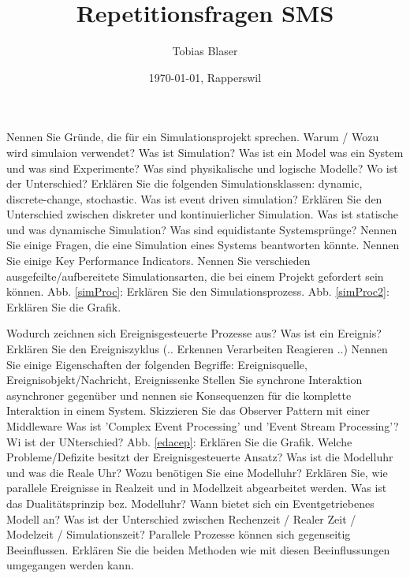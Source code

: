 \documentclass[ngerman,a4paper,12pt]{scrreprt}
\title{Repetitionsfragen SMS}
\author{Tobias Blaser}
\date{\today{}, Rapperswil}
\begin{document}
\tableofcontents
\clearpage

\ol
	\li Nennen Sie Gründe, die für ein Simulationsprojekt sprechen.
	\li Warum / Wozu wird simulaion verwendet?
	\li Was ist Simulation?
	\li Was ist ein Model was ein System und was sind Experimente?
	\li Was sind physikalische und logische Modelle? Wo ist der Unterschied?
	\li Erklären Sie die folgenden Simulationsklassen: dynamic, discrete-change, stochastic.
	\li Was ist event driven simulation?
	\li Erklären Sie den Unterschied zwischen diskreter und kontinuierlicher Simulation.
	\li Was ist statische und was dynamische Simulation?
	\li Was sind equidistante Systemsprünge?
	\li Nennen Sie einige Fragen, die eine Simulation eines Systems beantworten könnte.
	\li Nennen Sie einige Key Performance Indicators.
	\li Nennen Sie verschieden ausgefeilte/aufbereitete Simulationsarten, die bei einem Projekt gefordert sein können.
	\li Abb. \ref{simProc}: Erklären Sie den Simulationsprozess.
	\li Abb. \ref{simProc2}: Erklären Sie die Grafik.
\olS


\olR
	\li Wodurch zeichnen sich Ereignisgesteuerte Prozesse aus?
	\li Was ist ein Ereignis?
	\li Erklären Sie den Ereigniszyklus (.. \ra Erkennen \ra Verarbeiten \ra Reagieren \ra ..)
	\li Nennen Sie einige Eigenschaften der folgenden Begriffe: Ereignisquelle, Ereignisobjekt/Nachricht, Ereignissenke
	\li Stellen Sie synchrone Interaktion asynchroner gegenüber und nennen sie Konsequenzen für die komplette Interaktion in einem System.
	\li Skizzieren Sie das Observer Pattern mit einer Middleware
	\li Was ist 'Complex Event Processing' und 'Event Stream Processing'? Wi ist der UNterschied?
	\li Abb. \ref{edacep}: Erklären Sie die Grafik.
	\li Welche Probleme/Defizite besitzt der Ereignisgesteuerte Ansatz?
	\li Was ist die Modelluhr und was die Reale Uhr? Wozu benötigen Sie eine Modelluhr?
	\li Erklären Sie, wie parallele Ereignisse in Realzeit und in Modellzeit abgearbeitet werden.
	\li Was ist das Dualitätsprinzip bez. Modelluhr?
	\li Wann bietet sich ein Eventgetriebenes Modell an?
	\li Was ist der Unterschied zwischen Rechenzeit / Realer Zeit / Modelzeit / Simulationszeit?
	\li Parallele Prozesse können sich gegenseitig Beeinflussen. Erklären Sie die beiden Methoden wie mit diesen Beeinflussungen umgegangen werden kann.
\olS
\end{document}
